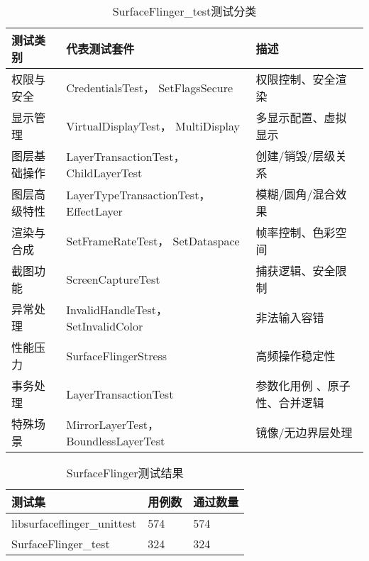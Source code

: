 \begin{table}[H]
    \centering
    \caption{SurfaceFlinger\_test测试分类}
    \label{tab:SurfaceFlinger_test测试分类}
    \begin{tabular}{lll}
        \toprule
        测试类别 & 代表测试套件	& 描述 \\
        \midrule
        权限与安全 & CredentialsTest， SetFlagsSecure & 权限控制、安全渲染 \\
        显示管理 & VirtualDisplayTest， MultiDisplay	& 多显示配置、虚拟显示 \\
        图层基础操作 & LayerTransactionTest， ChildLayerTest	& 创建/销毁/层级关系 \\
        图层高级特性 & LayerTypeTransactionTest， EffectLayer & 模糊/圆角/混合效果 \\
        渲染与合成 & SetFrameRateTest， SetDataspace	& 帧率控制、色彩空间 \\
        截图功能 & ScreenCaptureTest & 捕获逻辑、安全限制 \\
        异常处理 & InvalidHandleTest， SetInvalidColor & 非法输入容错 \\
        性能压力 & SurfaceFlingerStress	& 高频操作稳定性 \\
        事务处理 & LayerTransactionTest &   参数化用例 、原子性、合并逻辑 \\
        特殊场景 & MirrorLayerTest， BoundlessLayerTest & 镜像/无边界层处理 \\        
        \bottomrule
    \end{tabular}
    \note{}
\end{table}

\begin{table}[H]
    \centering
    \caption{SurfaceFlinger测试结果}
    \label{tab:SurfaceFlinger测试结果}
    \begin{tabular}{lll}
      \toprule
      测试集 & 用例数 & 通过数量 \\
      \midrule
      libsurfaceflinger\_unittest & 574 & 574 \\
      SurfaceFlinger\_test & 324 & 324 \\
      \bottomrule
    \end{tabular}
    \note{}
\end{table}




